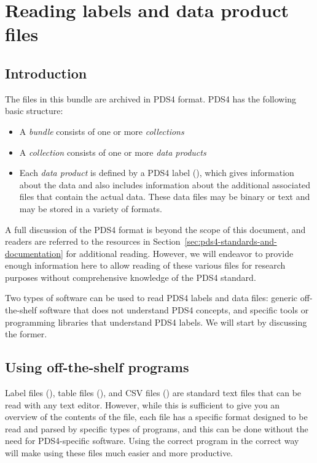 
\section{Reading labels and data product files}
\label{sec:reading-labels-and-data-product-files}


\subsection{Introduction}
\label{sec:introduction-2}

The files in this bundle are archived in PDS4 format. PDS4 has the following basic structure:

\begin{itemize}
\item A \textit{bundle} consists of one or more \textit{collections}
\item A \textit{collection} consists of one or more \textit{data products}
\item Each \textit{data product} is defined by a PDS4 label (), which gives information about the data and also includes information about the additional associated files that contain the actual data. These data files may be binary or text and may be stored in a variety of formats.
\end{itemize}
A full discussion of the PDS4 format is beyond the scope of this document, and readers are referred to the resources in Section~\ref{sec:pds4-standards-and-documentation} for additional reading. However, we will endeavor to provide enough information here to allow reading of these various files for research purposes without comprehensive knowledge of the PDS4 standard.

Two types of software can be used to read PDS4 labels and data files: generic off-the-shelf software that does not understand PDS4 concepts, and specific tools or programming libraries that understand PDS4 labels. We will start by discussing the former.


\subsection{Using off-the-shelf programs}
\label{sec:using-off-the-shelf-programs}

Label files (), table files (), and CSV files () are standard text files that can be read with any text editor. However, while this is sufficient to give you an overview of the contents of the file, each file has a specific format designed to be read and parsed by specific types of programs, and this can be done without the need for PDS4-specific software. Using the correct program in the correct way will make using these files much easier and more productive.


